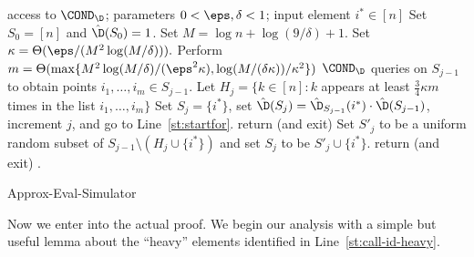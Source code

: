 \begin{algorithm}\begin{algorithmic}[1]
\Require access to $\COND_\D$; parameters $0 < \eps,\delta <1$;
input element $i^\ast \in [n]$
\State \label{st:initialize}
Set $S_0 = [n]$ and $\hat{\D}(S_0)=1$. Set $M = \log n + \log(9/\delta) +1.$
Set $\kappa = \Theta(\eps/(M^2 \log({M}/\delta))).$
 \label{st:startfor}
   \label{st:just-one}
  \EndIf
  \State Perform {$m = \Theta( \max\{M^2 \log(M / \delta)/(\eps^2 \kappa),
   \log(M/(\delta \kappa))/\kappa^2
 \} )$} $\COND_\D$ queries on $S_{j-1}$ to
obtain points $i_1,\dots,i_m \in S_{j-1}$. \label{st:cond-queries-on-Sj-1}
  \State Let $H_{j} = \{k \in [n]: k$ appears at least ${\frac 3 4} \kappa m$
times in the list $i_1,\dots,i_m\}$ \label{st:call-id-heavy}
   \label{st:hatD-iast-defn}
\label{st:hatD-iast-big}
  \State Set $S_{j} = \{i^\ast\}$, set
$\hat{\D}(S_j)=\hat{\D}_{S_{j-1}}(i^\ast) \cdot \hat{\D}(S_{j-1})$,
increment $j$, and go to Line~\ref{st:startfor}. \label{st:setDhat1}
  \EndIf
\label{st:hatD-Hj-accurate}
   \label{st:how-big-is-heavy}
  \State return \unknown (and exit) \label{st:unknown}
  \EndIf
  \State Set $S'_{j}$ to be a uniform random subset
of $S_{j-1} \setminus (H_{j} \cup \{i^\ast\})$
and set $S_j$ to be $S'_j \cup \{i^\ast\}$. \label{st:random-subset}
\label{st:hatD-Sj-large}
   \label{st:none}
  \State return \unknown (and exit) \label{st:unknown2}
  \EndIf
   \label{st:setDhat2}
  \EndFor  \label{st:endfor}
  \State \Return \fail.  \label{st:fail}
\end{algorithmic}\caption{\label{algo:approx-eval-simulator}\sc
Approx-Eval-Simulator}
\end{algorithm}

Now we enter into the actual proof.
We begin our analysis with a simple but useful lemma about the ``heavy''
elements identified in Line~\ref{st:call-id-heavy}.

